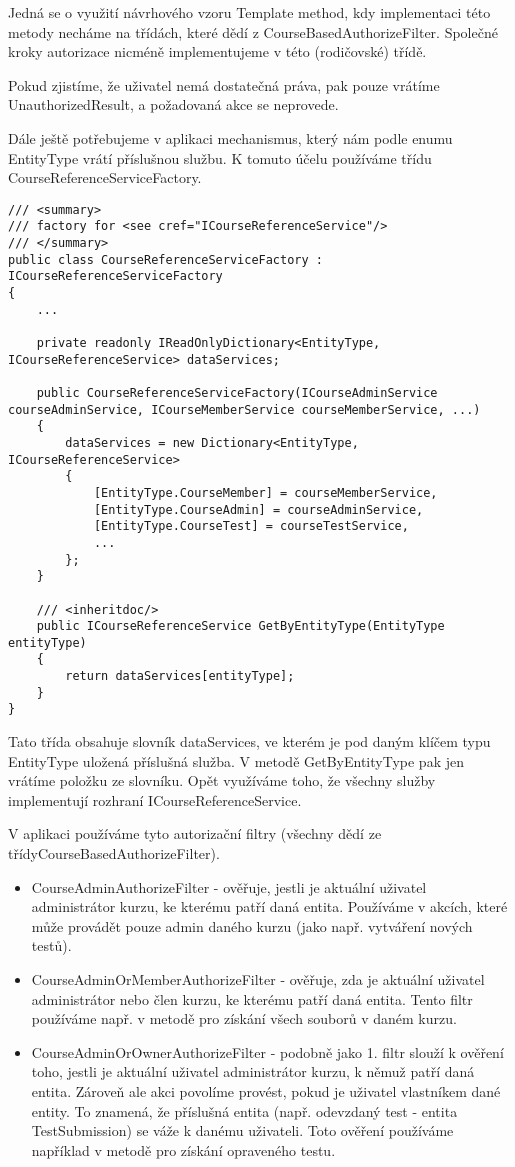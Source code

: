 Jedná se o využití návrhového vzoru Template method, kdy implementaci této metody necháme na třídách, které dědí z CourseBasedAuthorizeFilter. 
Společné kroky autorizace nicméně implementujeme v této (rodičovské) třídě.

Pokud zjistíme, že uživatel nemá dostatečná práva, pak pouze vrátíme UnauthorizedResult, a požadovaná akce se neprovede.

Dále ještě potřebujeme v aplikaci mechanismus, který nám podle enumu EntityType vrátí příslušnou službu. K tomuto účelu používáme třídu CourseReferenceServiceFactory.
\begin{lstlisting}
/// <summary>
/// factory for <see cref="ICourseReferenceService"/>
/// </summary>
public class CourseReferenceServiceFactory : ICourseReferenceServiceFactory
{
	...
	
	private readonly IReadOnlyDictionary<EntityType, ICourseReferenceService> dataServices;
	
	public CourseReferenceServiceFactory(ICourseAdminService courseAdminService, ICourseMemberService courseMemberService, ...)
	{
		dataServices = new Dictionary<EntityType, ICourseReferenceService>
		{
			[EntityType.CourseMember] = courseMemberService,
			[EntityType.CourseAdmin] = courseAdminService,
			[EntityType.CourseTest] = courseTestService,
			...
		};
	}
	
	/// <inheritdoc/>
	public ICourseReferenceService GetByEntityType(EntityType entityType)
	{
		return dataServices[entityType];
	}
}
\end{lstlisting}

Tato třída obsahuje slovník dataServices, ve kterém je pod daným klíčem typu EntityType uložená příslušná služba.
V metodě GetByEntityType pak jen vrátíme položku ze slovníku.
Opět využíváme toho, že všechny služby implementují rozhraní ICourseReferenceService.

V aplikaci používáme tyto autorizační filtry (všechny dědí ze třídyCourseBasedAuthorizeFilter).
\begin{itemize}
	\item CourseAdminAuthorizeFilter - ověřuje, jestli je aktuální uživatel administrátor kurzu, ke kterému patří daná entita. Používáme v akcích, které může provádět pouze admin daného kurzu (jako např. vytváření nových testů).
	\item CourseAdminOrMemberAuthorizeFilter - ověřuje, zda je aktuální uživatel administrátor nebo člen kurzu, ke kterému patří daná entita. Tento filtr používáme např. v metodě pro získání všech souborů v daném kurzu.
	\item CourseAdminOrOwnerAuthorizeFilter - podobně jako 1. filtr slouží k ověření toho, jestli je aktuální uživatel administrátor kurzu, k němuž patří daná entita. Zároveň ale akci povolíme provést, pokud je uživatel vlastníkem dané entity. To znamená, že příslušná entita (např. odevzdaný test - entita TestSubmission) se váže k danému uživateli. Toto ověření používáme například v metodě pro získání opraveného testu.
\end{itemize}

